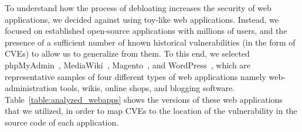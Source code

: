 
To understand how the process of debloating increases the security of web
applications, we decided against using toy-like web applications. Instead,
we focused on established open-source applications with millions of users,
and the presence of a sufficient number of known historical vulnerabilities
(in the form of CVEs) to allow us to generalize from them. To this end, we
selected {phpMyAdmin}~\cite{phpmyadmin},
{MediaWiki}~\cite{mediawiki}, {Magento}~\cite{magento}, and WordPress~\cite{wordpress},
which are representative samples of four different types of
web applications namely web-administration tools, wikis, online
shops, and blogging software. Table~\ref{table:analyzed_webapps} shows the versions of these web
applications that we utilized, in order to map CVEs to the location of the
vulnerability in the source code of each application.


